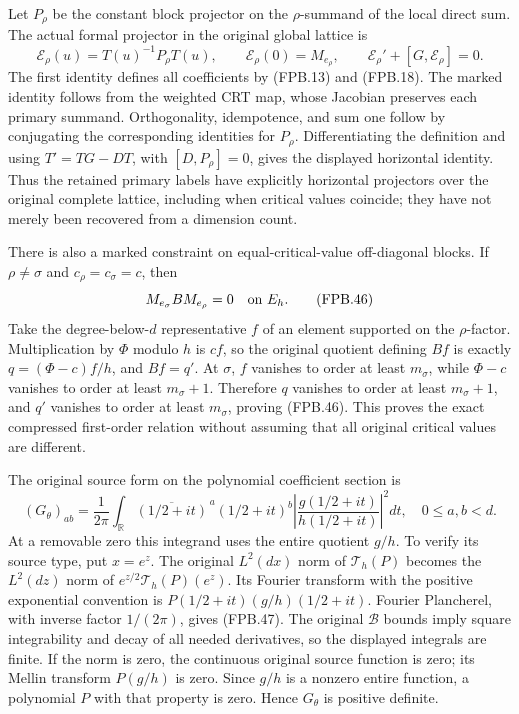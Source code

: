 Let \(P_\rho\) be the constant block projector on the \(\rho\)-summand
of the local direct sum. The actual formal projector in the original
global lattice is
\[
 \mathcal E_\rho(u)=T(u)^{-1}P_\rho T(u),\qquad
 \mathcal E_\rho(0)=M_{e_\rho},\qquad
 \mathcal E_\rho'+[G,\mathcal E_\rho]=0.
 \tag{FPB.45}\label{eq:fpb-projectors}
\]
The first identity defines all coefficients by (FPB.13) and
(FPB.18). The marked identity follows from the weighted CRT map,
whose Jacobian preserves each primary summand. Orthogonality,
idempotence, and sum one follow by conjugating the corresponding
identities for \(P_\rho\). Differentiating the definition and using
\(T'=TG-DT\), with \([D,P_\rho]=0\), gives the displayed horizontal
identity. Thus the retained primary labels have explicitly horizontal
projectors over the original complete lattice, including when critical
values coincide; they have not merely been recovered from a dimension
count.

There is also a marked constraint on equal-critical-value off-diagonal
blocks. If \(\rho\ne\sigma\) and \(c_\rho=c_\sigma=c\), then
\[
 M_{e_\sigma}B M_{e_\rho}=0\quad\hbox{on }E_h.
 \tag{FPB.46}\label{eq:fpb-equal-c}
\]
Take the degree-below-\(d\) representative \(f\) of an element
supported on the \(\rho\)-factor. Multiplication by \(\Phi\)
modulo \(h\) is \(c f\), so the original quotient defining \(Bf\)
is exactly \(q=(\Phi-c)f/h\), and \(Bf=q'\). At \(\sigma\),
\(f\) vanishes to order at least \(m_\sigma\), while
\(\Phi-c\) vanishes to order at least \(m_\sigma+1\). Therefore
\(q\) vanishes to order at least \(m_\sigma+1\), and \(q'\)
vanishes to order at least \(m_\sigma\), proving (FPB.46).
This proves the exact compressed first-order relation without assuming
that all original critical values are different.

The original source form on the polynomial coefficient section is
\[
 (G_\theta)_{ab}=\frac1{2\pi}\int_{\mathbb R}
   \overline{(1/2+it)}^{\,a}(1/2+it)^b
       \left|\frac{g(1/2+it)}{h(1/2+it)}\right|^2dt,
 \quad 0\le a,b<d.
 \tag{FPB.47}\label{eq:fpb-original-metric}
\]
At a removable zero this integrand uses the entire quotient \(g/h\).
To verify its source type, put \(x=e^z\). The original
\(L^2(dx)\) norm of \(\mathcal T_h(P)\) becomes the
\(L^2(dz)\) norm of \(e^{z/2}\mathcal T_h(P)(e^z)\).
Its Fourier transform with the positive exponential convention is
\(P(1/2+it)(g/h)(1/2+it)\). Fourier Plancherel, with inverse
factor \(1/(2\pi)\), gives (FPB.47). The original
\(\mathscr B\) bounds imply square integrability and decay of all
needed derivatives, so the displayed integrals are finite. If the
norm is zero, the continuous original source function is zero;
its Mellin transform \(P(g/h)\) is zero. Since \(g/h\) is a
nonzero entire function, a polynomial \(P\) with that property is
zero. Hence \(G_\theta\) is positive definite.

